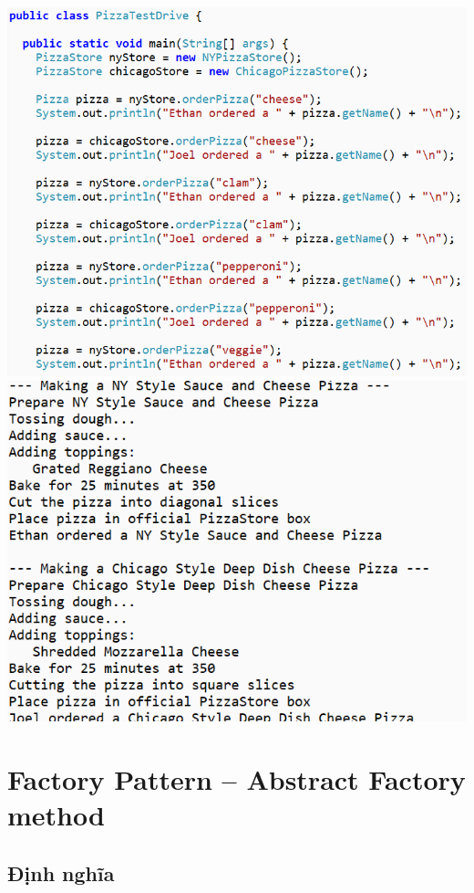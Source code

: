 \begin{center}
	\includegraphics[height=.55\textheight]{GALLEYS/images/chapter5/images8}
	\includegraphics[height=.4\textheight]{GALLEYS/images/chapter5/images9}
\end{center}

\section{Factory Pattern – Abstract Factory method}
\subsection{Định nghĩa}

